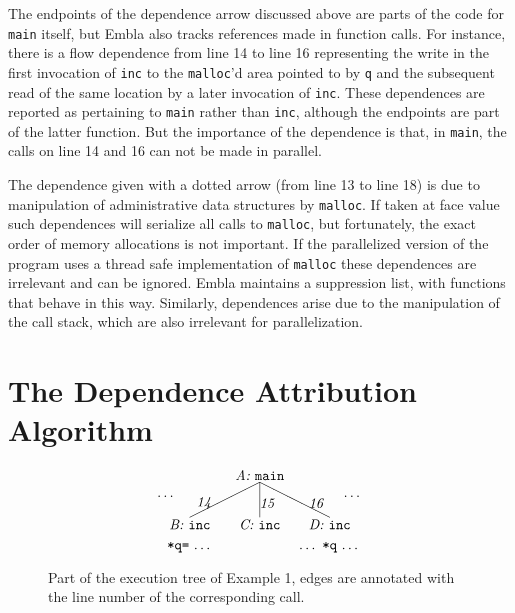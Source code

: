 \documentclass{acm_proc_article-sp}
\begin{document}
The endpoints of the dependence arrow discussed above are parts of
the code for {\tt main} itself, but Embla also tracks references made 
in function calls. For
instance, there is a flow dependence from line 14 to line 16
representing the write in the first invocation of {\tt inc} to the 
{\tt malloc}'d area pointed to by {\tt q} and the subsequent read 
of the same location by a later invocation of {\tt inc}. 
These dependences 
are reported as pertaining to {\tt main} rather than {\tt inc},
although the endpoints are part of the latter function. 
But the importance of the dependence is that, in {\tt main}, the calls
on line 14 and 16 can not be made in parallel.

The dependence given with a dotted arrow 
(from line 13 to line 18) is due to manipulation of administrative 
data structures by {\tt malloc}. If taken at face value such dependences will
serialize all calls to {\tt malloc}, but fortunately, the exact order
of memory allocations is not important. If the 
parallelized version of the program uses a thread safe 
implementation of {\tt malloc} these dependences are irrelevant and
can be ignored. Embla maintains a suppression list, with functions that behave 
in this way.  Similarly, dependences arise due to the
manipulation of the call stack, which are also irrelevant for parallelization.



\section{The Dependence Attribution Algorithm}

\begin{figure} \small
\hrulefill
\[
\begin{picture}(160,60)(70,15)
\put(120,65){\makebox(60,10)[c]{\it A:\ \tt main}}
\put(150,65){\line(-2,-1){50}}
\put(150,65){\line( 0,-1){25}}
\put(150,65){\line( 2,-1){50}}
\put(95,45){\makebox(20,10)[r]{\it 14}}
\put(150,45){\makebox(20,10)[l]{\it 15}}
\put(185,45){\makebox(20,10)[l]{\it 16}}
\put(70,50){\makebox(20,10)[r]{\ldots}}
\put(210,50){\makebox(20,10)[l]{\ldots}}
\put(170,30){\makebox(60,10)[c]{\it D:\ \tt inc}}
\put(120,30){\makebox(60,10)[c]{\it C:\ \tt inc}}
\put(70,30){\makebox(60,10)[c]{\it B:\ \tt inc}}
\put(70,15){\makebox(60,10)[cb]{{\tt *q=}\ \ldots}}
\put(170,15){\makebox(60,10)[cb]{\ldots\ {\tt *q}\ \ldots}}
\end{picture}
\]
\hrulefill
\caption{Part of the execution tree of Example 1, edges are annotated 
with the line number of the corresponding call.} 
\label{ffextree}
\end{figure}
\end{document}
